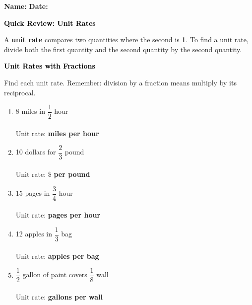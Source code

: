\documentclass[12pt, letterpaper, fleqn]{article}
\newcommand{\blankshorter}{\underline{\hspace{1.5cm}}}
\begin{document}
\textbf{Name:} \underline{\hspace{5cm}}
\hfill
\textbf{Date:} \underline{\hspace{3cm}}\\

\begin{tcolorbox}[colback=customteal!20]
    \large\textcolor{black}{\textbf{Quick Review: Unit Rates}}
\end{tcolorbox}

\vspace{3mm}

\noindent
A \textbf{unit rate} compares two quantities where the second is \textbf{1}. To find a unit rate, divide both the first quantity and the second quantity by the second quantity.

\vspace{4mm}

\begin{tcolorbox}[colback=customteal!20]
\large\textcolor{black}{\textbf{Unit Rates with Fractions}}
\end{tcolorbox}

\noindent
Find each unit rate. Remember: division by a fraction means multiply by its reciprocal.

\vspace{2mm}

\begin{enumerate}[itemsep=1cm, leftmargin=0.6cm]
\item 8 miles in $\dfrac{1}{2}$ hour\\ \\
Unit rate: \blankshorter \; \textbf{miles per hour}

\item 10 dollars for $\dfrac{2}{3}$ pound\\ \\
Unit rate: \$ \blankshorter \; \textbf{per pound}

\item 15 pages in $\dfrac{3}{4}$ hour\\ \\
Unit rate: \blankshorter \; \textbf{pages per hour}

\item 12 apples in $\dfrac{1}{3}$ bag\\ \\
Unit rate: \blankshorter \; \textbf{apples per bag}

\item $\dfrac{1}{2}$ gallon of paint covers $\dfrac{1}{8}$ wall\\ \\
Unit rate: \blankshorter \; \textbf{gallons per wall}

\end{enumerate}
\end{document}
